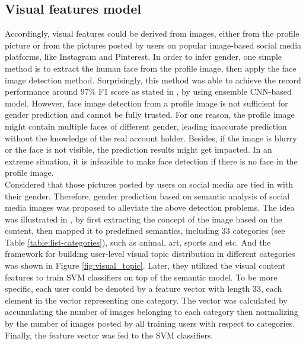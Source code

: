 \documentclass[runningheads]{llncs}
\begin{document}
	
	\subsection{Visual features model}
	
	Accordingly, visual features could be derived from images, either from the profile picture or from the pictures posted by users on popular image-based social media platforms, like Instagram and Pinterest. In order to infer gender, one simple method is to extract the human face from the profile image, then apply the face image detection method. Surprisingly, this method was able to achieve the record performance around 97\% F1 score as stated in \cite{antipov2016minimalistic}, by using ensemble CNN-based model. However, face image detection from a profile image is not sufficient for gender prediction and cannot be fully trusted. For one reason, the profile image might contain multiple faces of different gender, leading inaccurate prediction without the knowledge of the real account holder. Besides, if the image is blurry or the face is not visible, the prediction results might get impacted. In an extreme situation,  it is infeasible to make face detection if there is no face in the profile image. \\
	
	Considered that those pictures posted by users on social media are tied in with their gender. Therefore, gender prediction based on semantic analysis of social media images was proposed to alleviate the above detection problems. The idea was illustrated in \cite{you2014eyes}, by first extracting the concept of the image based on the content, then mapped it to predefined semantics, including 33 categories (see Table \ref{table:list-categories}), such as animal, art, sports and etc. And the framework for building user-level visual topic distribution in different categories was shown in Figure \ref{fig:visual_topic}. Later, they utilized the visual content features to train SVM classifiers on top of the semantic model. To be more specific, each user could be denoted by a feature vector with length 33, each element in the vector representing one category. The vector was calculated by accumulating the number of images belonging to each category then normalizing by the number of images posted by all training users with respect to categories. Finally, the feature vector was fed to the SVM classifiers. \\
	
\end{document}
